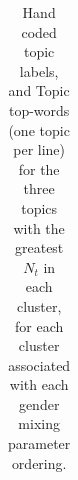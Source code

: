 \documentclass{pnastwo}
\begin{document}
\begin{article}
\begin{table}
\begin{tabular}{lm{}|lm{}}
		\bottomrule
	\end{tabular}
	\caption{\label{tab:top words for each pattern} Hand coded topic labels, and Topic top-words (one topic per line) for the three topics with the greatest $N_t$ in each cluster, for each cluster associated with each gender mixing parameter ordering.}
\end{table}



\end{article}
\end{document}

